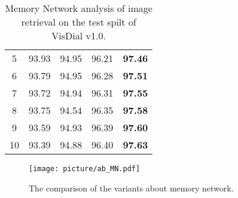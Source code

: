 \documentclass[review]{elsarticle}
\begin{document}
\begin{table}[]
{\begin{tabular}{c|c|c|c|c}
			5     & 93.93                                                               & 94.95                                                            & 96.21                                                          & \textbf{97.46}                                                         \\
			6     & 93.79                                                               & 94.95                                                            & 96.28                                                           & \textbf{97.51}                                                         \\
			7     & 93.72                                                               & 94.94                                                            & 96.31                                                          & \textbf{97.55}                                                         \\
			8     & 93.75                                                               & 94.54                                                            & 96.35                                                          & \textbf{97.58}                                                         \\
			9     & 93.59                                                               & 94.93                                                            & 96.39                                                          & \textbf{97.60}                                                         \\
			10    & 93.39                                                               & 94.88                                                            & 96.40                                                          & \textbf{97.63}                                                         \\ \hline
		\end{tabular}
	}
	\caption{Memory Network analysis of image retrieval on the test spilt of VisDial v1.0.}
	\label{Tab4}
\end{table}

	\begin{figure*}[]
		\centering
		\texttt{[image: picture/ab\_MN.pdf]}
		\centering 
		\caption{The comparison of the variants about memory network.} 
		\label{fig.mn_ab}
	\end{figure*}
	
\end{document}
